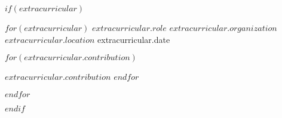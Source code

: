 \documentclass[11pt, a4paper]{awesome-cv}
\begin{document}
    $if(extracurricular)$

    \begin{cventries}
        $for(extracurricular)$
        \cventry
        {$extracurricular.role$} %
        {$extracurricular.organization$} %
        {$extracurricular.location$} %
        {extracurricular.date} %
        {
        \begin{cvitems}
            $for(extracurricular.contribution)$
            \item {$extracurricular.contribution$}
            $endfor$
        \end{cvitems}
        }
        $endfor$
    \end{cventries}
    $endif$
\end{document}
